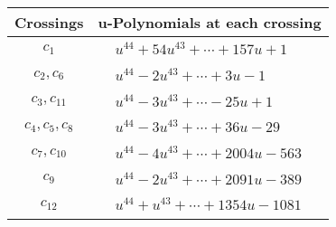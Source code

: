 \documentclass[1p]{elsarticle_modified}
\theoremstyle{definition}
\begin{document}
\begin{tabular}{m{50pt}|m{274pt}}
Crossings & \hspace{64pt}u-Polynomials at each crossing \\
\hline $$\begin{aligned}c_{1}\end{aligned}$$&$\begin{aligned}
&u^{44}+54 u^{43}+\cdots+157 u+1
\end{aligned}$\\
\hline $$\begin{aligned}c_{2},c_{6}\end{aligned}$$&$\begin{aligned}
&u^{44}-2 u^{43}+\cdots+3 u-1
\end{aligned}$\\
\hline $$\begin{aligned}c_{3},c_{11}\end{aligned}$$&$\begin{aligned}
&u^{44}-3 u^{43}+\cdots-25 u+1
\end{aligned}$\\
\hline $$\begin{aligned}c_{4},c_{5},c_{8}\end{aligned}$$&$\begin{aligned}
&u^{44}-3 u^{43}+\cdots+36 u-29
\end{aligned}$\\
\hline $$\begin{aligned}c_{7},c_{10}\end{aligned}$$&$\begin{aligned}
&u^{44}-4 u^{43}+\cdots+2004 u-563
\end{aligned}$\\
\hline $$\begin{aligned}c_{9}\end{aligned}$$&$\begin{aligned}
&u^{44}-2 u^{43}+\cdots+2091 u-389
\end{aligned}$\\
\hline $$\begin{aligned}c_{12}\end{aligned}$$&$\begin{aligned}
&u^{44}+u^{43}+\cdots+1354 u-1081
\end{aligned}$\\
\hline
\end{tabular}\\~\\
\newpage\renewcommand{\arraystretch}{1}
\end{document}
